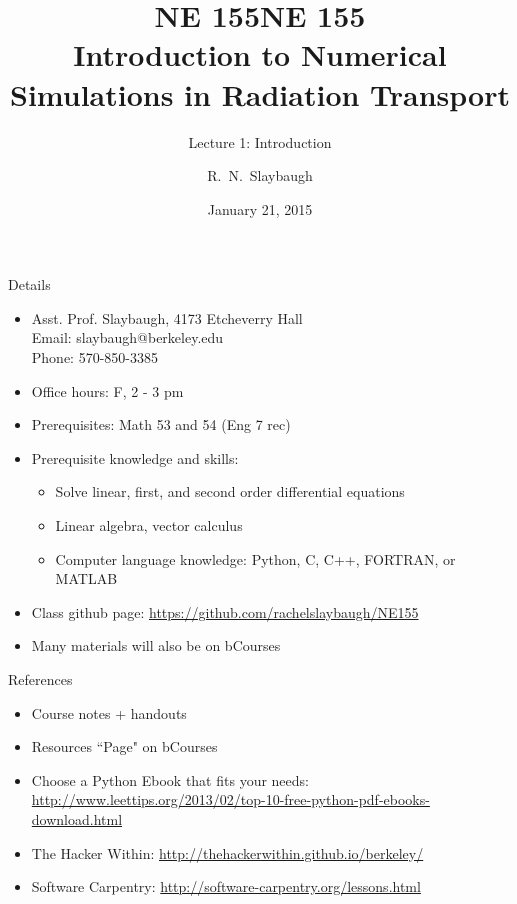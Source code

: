 \documentclass[xcolor=x11names,compress]{beamer}
\title{NE 155}
\author{R.\ N.\ Slaybaugh}
\date{January 21, 2015}
\renewcommand{\(}{\begin{columns}}
\renewcommand{\)}{\end{columns}}
\newcommand{\<}[1]{\begin{column}{#1}}
\renewcommand{\>}{\end{column}}
\begin{document}
\begin{frame}
\title{NE 155\\Introduction to Numerical Simulations in Radiation Transport}
\subtitle{Lecture 1: Introduction}
\titlepage
\end{frame}

\begin{frame}{Details}
\begin{itemize}
\item Asst. Prof. Slaybaugh, 4173 Etcheverry Hall\\
      Email: slaybaugh@berkeley.edu \\
      Phone: 570-850-3385
\item Office hours: F, 2 - 3 pm
\item Prerequisites: Math 53 and 54 (Eng 7 rec)
\item Prerequisite knowledge and skills: 
\begin{itemize}
\item Solve linear, first, and second order differential equations
\item Linear algebra, vector calculus
\item Computer language knowledge: Python, C, C++, FORTRAN, or MATLAB	
\end{itemize}
\item Class github page: \href{https://github.com/rachelslaybaugh/NE155}{https://github.com/rachelslaybaugh/NE155}
\item Many materials will also be on bCourses
\end{itemize}
\end{frame}

\begin{frame}{References}
\begin{itemize}
\item Course notes + handouts
\item Resources ``Page" on bCourses
\item Choose a Python Ebook that fits your needs:
\href{http://www.leettips.org/2013/02/top-10-free-python-pdf-ebooks-download.html}{http://www.leettips.org/2013/02/top-10-free-python-pdf-ebooks-download.html}
\item The Hacker Within: \href{http://thehackerwithin.github.io/berkeley/}{http://thehackerwithin.github.io/berkeley/}
\item Software Carpentry: \href{http://software-carpentry.org/lessons.html}{http://software-carpentry.org/lessons.html}
\end{itemize}
\end{frame}
\end{document}
